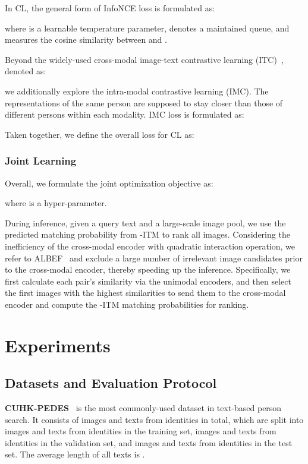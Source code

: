 \documentclass{article}
\begin{document}
In CL, the general form of InfoNCE loss is formulated as:
\begin{small}

\end{small}
where  is a learnable temperature parameter,  denotes a maintained queue, and  measures the cosine similarity between  and . 

Beyond the widely-used cross-modal image-text contrastive learning (ITC)~\cite{NEURIPS2021_50525975,radford2021learning}, denoted as:

we additionally explore the intra-modal contrastive learning (IMC).
The representations of the same person are supposed to stay closer than those of different persons within each modality. IMC loss is formulated as:


Taken together, we define the overall loss for CL as:








\subsubsection{Joint Learning}
Overall, we formulate the joint optimization objective as:

where  is a hyper-parameter.

During inference, given a query text and a large-scale image pool, we use the predicted matching probability from -ITM to rank all images. 
Considering the inefficiency of the cross-modal encoder with quadratic interaction operation, we refer to ALBEF~\cite{NEURIPS2021_50525975} and exclude a large number of irrelevant image candidates prior to the cross-modal encoder, thereby speeding up the inference.
Specifically, we first calculate each pair's similarity  via the unimodal encoders, and then select the first  images with the highest similarities to send them to the cross-modal encoder and compute the -ITM matching probabilities for ranking.


\section{Experiments}

\iffalse
\subsection{Datasets and Evaluation Protocol}
\textbf{CUHK-PEDES}~\cite{li2017person} is the most commonly-used dataset in text-based person search. It consists of  images and  texts from  identities in total, which are split into  images and  texts from  identities in the training set,  images and  texts from  identities in the validation set, and  images and  texts from  identities in the test set. The average length of all texts is . 
\end{document}

